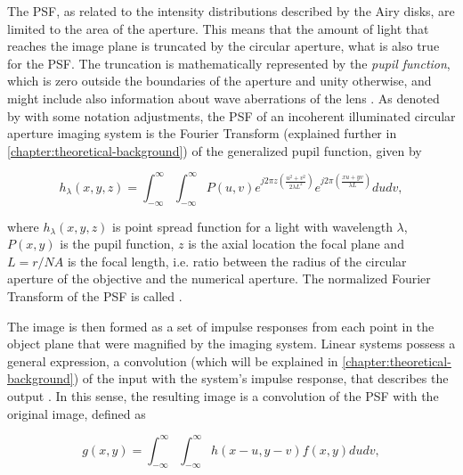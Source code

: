 The PSF, as related to the intensity distributions described by the Airy disks, are limited to the area of the aperture. This means that the amount of light that reaches the image plane is truncated by the circular aperture, what is also true for the PSF. The truncation is mathematically represented by the \emph{pupil function}, which is zero outside the boundaries of the aperture and unity otherwise, and might include also information about wave aberrations of the lens \cite{goodman1996introduction}. As denoted by  with some notation adjustments, the PSF of an incoherent illuminated circular aperture imaging system is the Fourier Transform (explained further in \autoref{chapter:theoretical-background}) of the generalized pupil function, given by

\begin{equation}
\label{eqn:incoherent_psf}
h_{\lambda}(x,y,z) = \int_{-\infty}^{\infty}
                     \int_{-\infty}^{\infty}
         P(u,v)
         e^{j 2 \pi z
            \left(
                \frac{u^{2} + v^{2}}{2 \lambda L^{2}}        
            \right)
        }
        e^{j 2 \pi
            \left(
                \frac{xu + yv}{\lambda L}        
            \right)
        }
        du dv,
\end{equation}

\noindent where $h_{\lambda}(x,y,z)$ is point spread function for a light with wavelength $\lambda$, $P(x,y)$ is the pupil function, $z$ is the axial location the focal plane and $L = r / NA$ is the focal length, i.e. ratio between the radius of the circular aperture of the objective and the numerical aperture. The normalized Fourier Transform of the PSF is called  \cite{castleman1996digital}.

The image is then formed as a set of impulse responses from each point in the object plane that were magnified by the imaging system. Linear systems possess a general expression, a convolution (which will be explained in \autoref{chapter:theoretical-background}) of the input with the system's impulse response, that describes the output \cite{brigham1988fast}. In this sense, the resulting image is a convolution of the PSF with the original image, defined as

\begin{equation}
\label{eqn:image_formation_convolution}
g(x,y) = \int_{-\infty}^{\infty}
         \int_{-\infty}^{\infty}
         h(x-u, y-v)f(x,y)du dv,
\end{equation}

